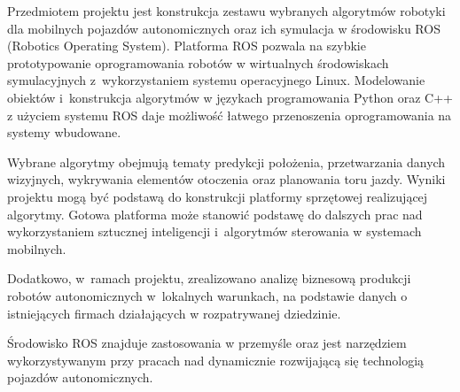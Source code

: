 Przedmiotem projektu jest konstrukcja zestawu wybranych algorytmów robotyki dla
mobilnych pojazdów autonomicznych oraz ich symulacja w środowisku ROS (Robotics
Operating
System). Platforma ROS pozwala na szybkie prototypowanie oprogramowania robotów
w wirtualnych środowiskach symulacyjnych z~wykorzystaniem systemu operacyjnego
Linux.
Modelowanie obiektów i~konstrukcja algorytmów w językach programowania Python
oraz C++ z użyciem systemu ROS daje możliwość łatwego przenoszenia
oprogramowania na systemy wbudowane.

Wybrane algorytmy obejmują tematy predykcji położenia, przetwarzania danych
wizyjnych, wykrywania elementów otoczenia oraz planowania toru jazdy. Wyniki
projektu mogą być podstawą do konstrukcji platformy sprzętowej realizującej
algorytmy. Gotowa platforma może stanowić podstawę do dalszych prac nad
wykorzystaniem sztucznej inteligencji i~algorytmów sterowania w systemach
mobilnych.

Dodatkowo, w~ramach projektu, zrealizowano analizę biznesową produkcji robotów
autonomicznych w~lokalnych warunkach, na podstawie danych o istniejących
firmach działających w rozpatrywanej dziedzinie.

Środowisko ROS znajduje zastosowania w przemyśle oraz jest narzędziem
wykorzystywanym
przy pracach nad dynamicznie rozwijającą się technologią pojazdów
autonomicznych.
